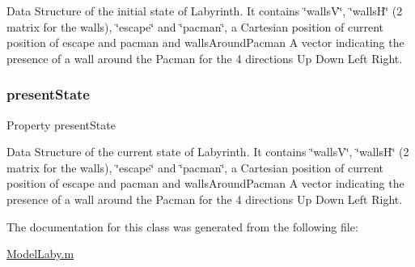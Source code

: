 Data Structure of the initial state of Labyrinth. It contains \char`\"{}walls\+V\char`\"{}, \char`\"{}walls\+H\char`\"{} (2 matrix for the walls), \char`\"{}escape\char`\"{} and \char`\"{}pacman\char`\"{}, a Cartesian position of current position of escape and pacman and \textquotesingle{}walls\+Around\+Pacman\textquotesingle{} A vector indicating the presence of a wall around the Pacman for the 4 directions Up Down Left Right. 

\mbox{\label{class_model_laby_a9624cc7c421a50fa5086b0ebd0cd5fe3}} 
\subsubsection{\texorpdfstring{present\+State}{presentState}}
{\footnotesize\ttfamily Property present\+State}



Data Structure of the current state of Labyrinth. It contains \char`\"{}walls\+V\char`\"{}, \char`\"{}walls\+H\char`\"{} (2 matrix for the walls), \char`\"{}escape\char`\"{} and \char`\"{}pacman\char`\"{}, a Cartesian position of current position of escape and pacman and \textquotesingle{}walls\+Around\+Pacman\textquotesingle{} A vector indicating the presence of a wall around the Pacman for the 4 directions Up Down Left Right. 



The documentation for this class was generated from the following file\+:\begin{DoxyCompactItemize}
\item 
\hyperlink{_model_laby_8m}{Model\+Laby.\+m}\end{DoxyCompactItemize}

